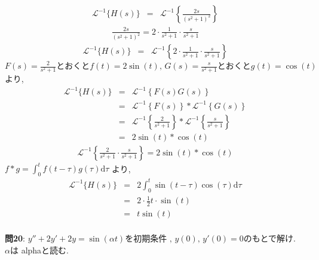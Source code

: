 ﻿\documentclass[a4j]{jarticle}
\begin{document}
\begin{eqnarray*}
\mathcal{L}^{-1} \{ H(s) \} &=& \mathcal{L}^{-1} \left\{ \frac{2s}{(s^2+1)^2} \right\}
\end{eqnarray*}
\begin{eqnarray*}
\frac{2s}{(s^2+1)^2} = 2\cdot\frac{1}{s^2+1}\cdot\frac{s}{s^2+1}
\end{eqnarray*}
\begin{eqnarray*}
\mathcal{L}^{-1} \{ H(s) \} &=& \mathcal{L}^{-1} \left\{ 2\cdot\frac{1}{s^2+1}\cdot\frac{s}{s^2+1} \right\}
\end{eqnarray*}
\( F(s)=\frac{2}{s^2+1} \text{とおくと} f(t) = 2\sin(t) ,\,
   G(s)=\frac{s}{s^2+1} \text{とおくと} g(t) = \cos(t) \) より,
%
\begin{eqnarray*}
\mathcal{L}^{-1} \{ H(s) \} &=& \mathcal{L}^{-1} \left\{ F(s)G(s) \right\} \\
                            &=& \mathcal{L}^{-1} \left\{ F(s) \right\} * \mathcal{L}^{-1} \left\{ G(s) \right\} \\
                            &=& \mathcal{L}^{-1} \left\{ \frac{2}{s^2+1} \right\} * \mathcal{L}^{-1} \left\{ \frac{s}{s^2+1} \right\} \\
                            &=& 2\sin(t) * \cos(t)
\end{eqnarray*}
\begin{eqnarray*}
\mathcal{L}^{-1} \left\{ \frac{2}{s^2+1}\cdot\frac{s}{s^2+1} \right\} = 2\sin(t) * \cos(t)
\end{eqnarray*}
\( f * g = \int_0^t{f(t-\tau)g(\tau)\mathrm{d}\tau } \) より,
\begin{eqnarray*}
\mathcal{L}^{-1}\{ H(s) \} &=& 2\int_0^t{\sin(t-\tau)\cos(\tau)\mathrm{d}\tau } \\
                           &=& 2 \cdot \frac{1}{2}t\cdot \sin(t) \\
                           &=& t \sin(t) \\
\end{eqnarray*}

\noindent
{\large {\bf 問20}}: \( y'' + 2y' + 2y = \sin(\alpha t) \)を初期条件 \( ,\, y(0) ,\, y'(0) = 0 \)のもとで解け. \\

\( \alpha \)は alphaと読む.
\end{document}
